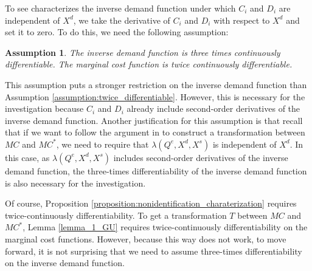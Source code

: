 \documentclass[11pt, a4paper]{article}
\newtheorem{assumption}{Assumption}
\theoremstyle{remark}
\begin{document}
To see characterizes the inverse demand function under which $C_i$ and $D_i$ are independent of $X^{d}$, we take the derivative of $C_i$ and $D_i$ with respect to $X^{d}$ and set it to zero.
To do this, we need the following assumption:
\begin{assumption}\label{assumption:three_times_differentiable}
    The inverse demand function is three times continuously differentiable.
    The marginal cost function is twice continuously differentiable.
\end{assumption}
This assumption puts a stronger restriction on the inverse demand function than Assumption \ref{assumption:twice_differentiable}.
However, this is necessary for the investigation because $C_i$ and $D_i$ already include second-order derivatives of the inverse demand function.
Another justification for this assumption is that recall that if we want to follow the argument in \citet{lau1982identifying} to construct a transformation between $MC$ and $MC^{*}$, we need to require that $\lambda(Q^e, X^{d}, X^{s})$ is independent of $X^{d}$.
In this case, as $\lambda(Q^e, X^{d}, X^{s})$ includes second-order derivatives of the inverse demand function, the three-times differentiability of the inverse demand function is also necessary for the investigation.

Of course, Proposition \ref{proposition:nonidentification_charaterization} requires twice-continuously differentiability.
To get a transformation $T$ between $MC$ and $MC^{*}$, Lemma \ref{lemma_1_GU} requires twice-continuously differentiability on the marginal cost functions.
However, because this way does not work, to move forward, it is not surprising that we need to assume three-times differentiability on the inverse demand function.
\end{document}
